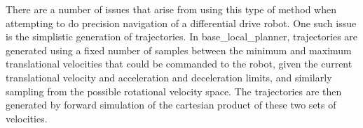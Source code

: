 There are a number of issues that arise from using this type of method when attempting to do precision navigation of a differential drive robot. One such issue is the simplistic generation of trajectories. In base\_local\_planner, trajectories are generated using a fixed number of samples between the minimum and maximum translational velocities that could be commanded to the robot, given the current translational velocity and acceleration and deceleration limits, and similarly sampling from the possible rotational velocity space. The trajectories are then generated by forward simulation of the cartesian product of these two sets of velocities.

